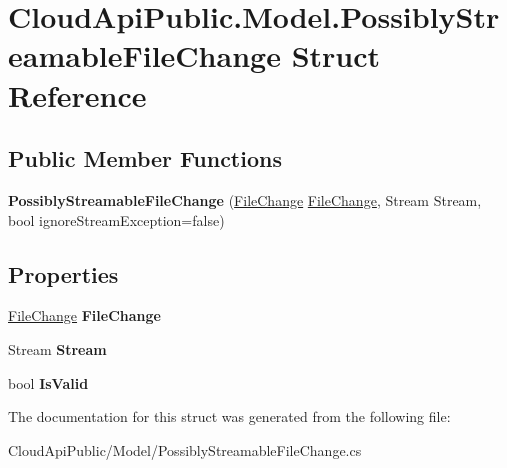 \hypertarget{struct_cloud_api_public_1_1_model_1_1_possibly_streamable_file_change}{\section{Cloud\-Api\-Public.\-Model.\-Possibly\-Streamable\-File\-Change Struct Reference}
\label{struct_cloud_api_public_1_1_model_1_1_possibly_streamable_file_change}
}
\subsection*{Public Member Functions}
\begin{DoxyCompactItemize}
\item 
\hypertarget{struct_cloud_api_public_1_1_model_1_1_possibly_streamable_file_change_a76782991ded25ce343f2b8fd2d7fc2a3}{{\bfseries Possibly\-Streamable\-File\-Change} (\hyperlink{class_cloud_api_public_1_1_model_1_1_file_change}{File\-Change} \hyperlink{class_cloud_api_public_1_1_model_1_1_file_change}{File\-Change}, Stream Stream, bool ignore\-Stream\-Exception=false)}\label{struct_cloud_api_public_1_1_model_1_1_possibly_streamable_file_change_a76782991ded25ce343f2b8fd2d7fc2a3}

\end{DoxyCompactItemize}
\subsection*{Properties}
\begin{DoxyCompactItemize}
\item 
\hypertarget{struct_cloud_api_public_1_1_model_1_1_possibly_streamable_file_change_a83ba4cb8a3136d9e81bb56a76f3b3c72}{\hyperlink{class_cloud_api_public_1_1_model_1_1_file_change}{File\-Change} {\bfseries File\-Change}}\label{struct_cloud_api_public_1_1_model_1_1_possibly_streamable_file_change_a83ba4cb8a3136d9e81bb56a76f3b3c72}

\item 
\hypertarget{struct_cloud_api_public_1_1_model_1_1_possibly_streamable_file_change_a2fae84b0571c97364211ebcb4e545d40}{Stream {\bfseries Stream}}\label{struct_cloud_api_public_1_1_model_1_1_possibly_streamable_file_change_a2fae84b0571c97364211ebcb4e545d40}

\item 
\hypertarget{struct_cloud_api_public_1_1_model_1_1_possibly_streamable_file_change_af389968fd4ace969285407a266855211}{bool {\bfseries Is\-Valid}}\label{struct_cloud_api_public_1_1_model_1_1_possibly_streamable_file_change_af389968fd4ace969285407a266855211}

\end{DoxyCompactItemize}


The documentation for this struct was generated from the following file\-:\begin{DoxyCompactItemize}
\item 
Cloud\-Api\-Public/\-Model/Possibly\-Streamable\-File\-Change.\-cs\end{DoxyCompactItemize}
